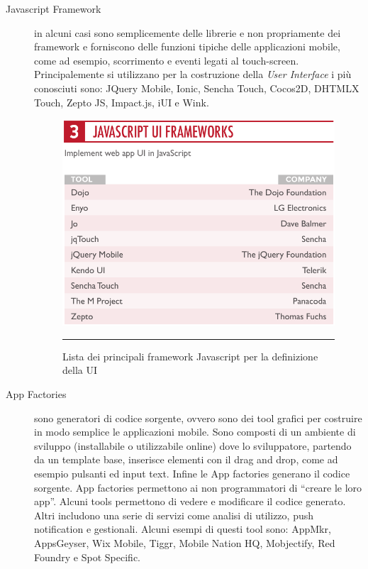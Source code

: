 \begin{description}

\item[Javascript Framework] in alcuni casi sono semplicemente delle librerie e non propriamente dei framework e forniscono delle funzioni tipiche delle applicazioni mobile, come ad esempio, scorrimento e eventi legati al touch-screen. Principalemente si utilizzano per la costruzione della \emph{User Interface} i più conosciuti sono: JQuery Mobile, Ionic, Sencha Touch, Cocos2D, DHTMLX Touch, Zepto JS, Impact.js, iUI e Wink.

\begin{figure}[htbp]
  \centering
   		\includegraphics[scale=0.6]{Figures/javascript-ui-framework.png} 
    \rule{35em}{0.5pt}
  \caption{Lista dei principali framework Javascript per la definizione della UI}
  \label{fig:ui_js_framework}
\end{figure}

\item[App Factories] sono generatori di codice sorgente, ovvero sono dei tool grafici per costruire in modo semplice le applicazioni mobile. Sono composti di un ambiente di sviluppo (installabile o utilizzabile online) dove lo sviluppatore, partendo da un template base, inserisce elementi con il drag and drop, come ad esempio pulsanti ed input text. Infine le App factories generano il codice sorgente. App factories permettono ai non programmatori di “creare le loro app”. Alcuni tools permettono di vedere e modificare il codice generato. Altri includono una serie di servizi come analisi di utilizzo, push notification e gestionali.
Alcuni esempi di questi tool sono: AppMkr, AppsGeyser, Wix Mobile, Tiggr, Mobile Nation HQ, Mobjectify, Red Foundry e Spot Specific.


\end{description}
